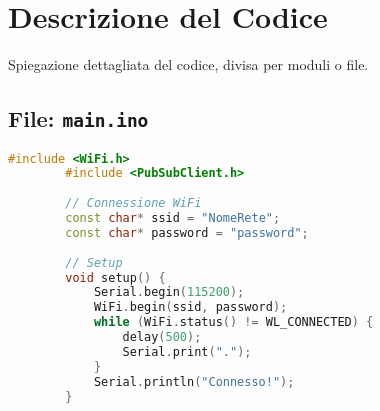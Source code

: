 \documentclass[12pt,a4paper]{article}
\begin{document}
	\section{Descrizione del Codice}
	Spiegazione dettagliata del codice, divisa per moduli o file.
	
	\subsection{File: \texttt{main.ino}}
	\begin{lstlisting}[language=C++, caption={File principale per ESP32}]
		#include <WiFi.h>
		#include <PubSubClient.h>
		
		// Connessione WiFi
		const char* ssid = "NomeRete";
		const char* password = "password";
		
		// Setup
		void setup() {
			Serial.begin(115200);
			WiFi.begin(ssid, password);
			while (WiFi.status() != WL_CONNECTED) {
				delay(500);
				Serial.print(".");
			}
			Serial.println("Connesso!");
		}
	\end{lstlisting}
	
	
	
\end{document}
